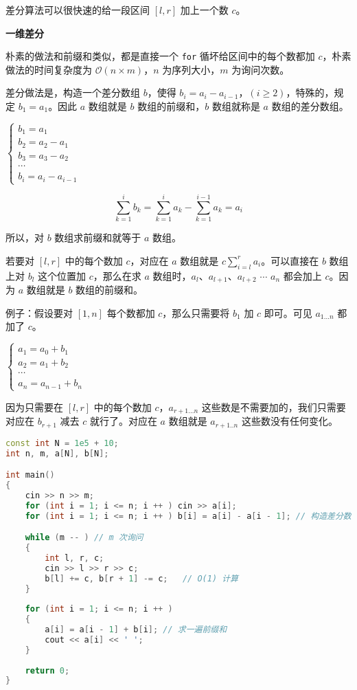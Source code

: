 
差分算法可以很快速的给一段区间 $[l, r]$ 加上一个数 $c$。

\textbf{一维差分}

朴素的做法和前缀和类似，都是直接一个 \verb|for| 循坏给区间中的每个数都加 $c$，朴素做法的时间复杂度为 $\mathcal{O}(n \times m)$，$n$ 为序列大小，$m$ 为询问次数。

差分做法是，构造一个差分数组 $b$，使得 $b_i = a_i - a_{i - 1}$，$(i \geq 2)$，特殊的，规定 $b_1 = a_1$。因此 $a$ 数组就是 $b$ 数组的前缀和，$b$ 数组就称是 $a$ 数组的差分数组。

$\begin{cases}
b_1 = a_1 \\
b_2 = a_2 - a_1 \\
b_3 = a_3 - a_2 \\
\cdots \\
b_i = a_i - a_{i - 1}
\end{cases}$

\begin{equation}
\sum^i_{k = 1}b_k = \sum^{i}_{k = 1} a_k - \sum^{i - 1}_{k = 1} a_k = a_i
\end{equation}

所以，对 $b$ 数组求前缀和就等于 $a$ 数组。

若要对 $[l, r]$ 中的每个数加 $c$，对应在 $a$ 数组就是 $c\sum^r_{i= l}a_i$。可以直接在 $b$ 数组上对 $b_l$ 这个位置加 $c$，那么在求 $a$ 数组时，$a_l$、$a_{l + 1}$、$a_{l + 2}$ $\cdots$ $a_n$ 都会加上 $c$。因为 $a$ 数组就是 $b$ 数组的前缀和。

例子：假设要对 $[1, n]$ 每个数都加 $c$，那么只需要将 $b_1$ 加 $c$ 即可。可见 $a_{1 ... n}$ 都加了 $c$。

$\begin{cases}
a_1 = a_0 + b_1 \\
a_2 = a_1 + b_2 \\
\cdots \\ 
a_n = a_{n - 1} + b_n
\end{cases}$

因为只需要在 $[l, r]$ 中的每个数加 $c$，$a_{r + 1 ... n}$ 这些数是不需要加的，我们只需要对应在 $b_{r + 1}$ 减去 $c$ 就行了。对应在 $a$ 数组就是 $a_{r + 1..n}$ 这些数没有任何变化。

\begin{lstlisting}[language=cpp]
const int N = 1e5 + 10;
int n, m, a[N], b[N];

int main() 
{
    cin >> n >> m;  
    for (int i = 1; i <= n; i ++ ) cin >> a[i];
    for (int i = 1; i <= n; i ++ ) b[i] = a[i] - a[i - 1]; // 构造差分数组

    while (m -- ) // m 次询问
    {
        int l, r, c;
        cin >> l >> r >> c;
        b[l] += c, b[r + 1] -= c;   // O(1) 计算
    }
    
    for (int i = 1; i <= n; i ++ ) 
    {
        a[i] = a[i - 1] + b[i]; // 求一遍前缀和
        cout << a[i] << ' ';   
    }
    
    return 0;
}
\end{lstlisting}

